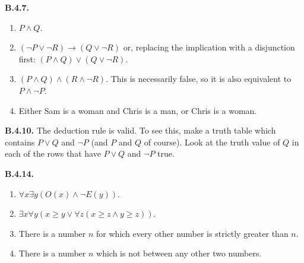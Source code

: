 \documentclass[10pt,]{book}
\theoremstyle{plain}
\theoremstyle{definition}
\theoremstyle{definition}
\theoremstyle{definition}
\theoremstyle{definition}
\numberwithin{equation}{chapter}
\def\imp{\rightarrow}
\begin{document}
\par\smallskip
\noindent\textbf{B.4.7.} \hypertarget{p-1878}{}%
\leavevmode%
\begin{enumerate}[label=(\alph*)]
\item\hypertarget{li-655}{}\(P \wedge Q\).%
\item\hypertarget{li-656}{}\((\neg P \vee \neg R) \imp (Q \vee \neg R)\) or, replacing the implication with a disjunction first: \((P \wedge Q) \vee (Q \vee \neg R)\).%
\item\hypertarget{li-657}{}\hypertarget{p-1879}{}%
\((P \wedge Q) \wedge (R \wedge \neg R)\). This is necessarily false, so it is also equivalent to \(P \wedge \neg P\).%
\item\hypertarget{li-658}{}\hypertarget{p-1880}{}%
Either Sam is a woman and Chris is a man, or Chris is a woman.%
\end{enumerate}
%
\par\smallskip
\noindent\textbf{B.4.10.} \hypertarget{p-1886}{}%
The deduction rule is valid. To see this, make a truth table which contains \(P \vee Q\) and \(\neg P\) (and \(P\) and \(Q\) of course). Look at the truth value of \(Q\) in each of the rows that have \(P \vee Q\) and \(\neg P\) true.%
\par\smallskip
\noindent\textbf{B.4.14.} \hypertarget{p-1898}{}%
\leavevmode%
\begin{enumerate}[label=(\alph*)]
\item\hypertarget{li-667}{}\(\forall x \exists y (O(x) \wedge \neg E(y))\).%
\item\hypertarget{li-668}{}\(\exists x \forall y (x \ge y \vee \forall z (x \ge z \wedge y \ge z))\).%
\item\hypertarget{li-669}{}\hypertarget{p-1899}{}%
There is a number \(n\) for which every other number is strictly greater than \(n\).%
\item\hypertarget{li-670}{}\hypertarget{p-1900}{}%
There is a number \(n\) which is not between any other two numbers.%
\end{enumerate}
%
\par\smallskip
\end{document}
